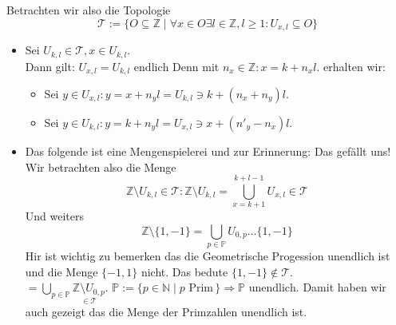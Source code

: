 Betrachten wir also die Topologie 
$$\mathcal{T} := \{ O \subseteq \mathbb{Z} \mid \forall x \in O \exists l \in \mathbb{Z}, l \ge 1 : U_{x,l} \subseteq O\}$$
\begin{itemize}
    \item Sei $U_{k,l} \in \mathcal{T}, x \in U_{k,l}$. \\
    Dann gilt: $U_{x,l}=U_{k,l} \text{ endlich}$
    Denn mit $n_x \in \mathbb{Z}: x = k + n_x l$. erhalten wir: \\
    \begin{itemize}
        \item Sei $y \in U_{x,l}: y = x + n_y l = U_{k,l} \ni k + (n_x + n_y)l$.
        \item Sei $y \in U_{k,l}: y = k + n_y l = U_{x,l} \ni x + (n'_y - n_{x})l$.
    \end{itemize}

    \item Das folgende ist eine Mengenspielerei und zur Erinnerung: Das gefällt uns!\\
    Wir betrachten also die Menge $$\mathbb{Z} \setminus U_{k,l} \in \mathcal{T}: \mathbb{Z} \setminus U_{k,l} 
    = \underset{x= k+1}{\overset{k+l-1}{\bigcup}} U_{x,l} \in \mathcal{T}$$
    Und weiters 
    $$\mathbb{Z}\setminus\{1,-1\} = \underset{p \in \mathbb{P}}{\bigcup} U_{0,p} \dots \{1,-1\}$$
    Hir ist wichtig zu bemerken das die Geometrische Progession unendlich ist und die Menge $\{-1,1\}$ nicht. 
    Das bedute $\{1,-1\} \notin \mathcal{T}$.\\
    $= \underset{p \in \mathbb{P}}{\bigcup}\underset{\in \mathcal{T}}{\mathbb{Z}\setminus{U_{0,p}}}$. 
    $\mathbb{P}:= \{p \in \mathbb{N} \mid p \text{ Prim} \,\} \Rightarrow \mathbb{P} \text{ unendlich}$.
    Damit haben wir auch gezeigt das die Menge der Primzahlen unendlich ist.
    
\end{itemize}

